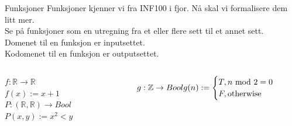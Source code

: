 \begin{frame}{Funksjoner}
    Funksjoner kjenner vi fra INF100 i fjor. Nå skal vi formalisere dem litt mer.\\
    Se på funksjoner som en utregning fra et eller flere sett til et annet sett.\\
    Domenet til en funksjon er inputsettet.\\
    Kodomenet til en funksjon er outputsettet.\\
    \pause
    \begin{columns}
    \begin{column}{0.25\textwidth}
         $f : \mathbb{R} \rightarrow \mathbb{R}$\\
        $f(x) := x+1$ \\
        
        $P : (\mathbb{R}, \mathbb{R}) \rightarrow Bool$\\
        $P(x, y) := x^2 < y$
     \end{column}
    \begin{column}{0.35\textwidth}
         $$
            g : \mathbb{Z} \rightarrow Bool \\
            g(n) :=
            \begin{cases}
            T, n \text{ mod } 2 = 0\\
            F, \text{otherwise}\\
            \end{cases}
        $$
    \end{column}
    \end{columns}
\end{frame}

